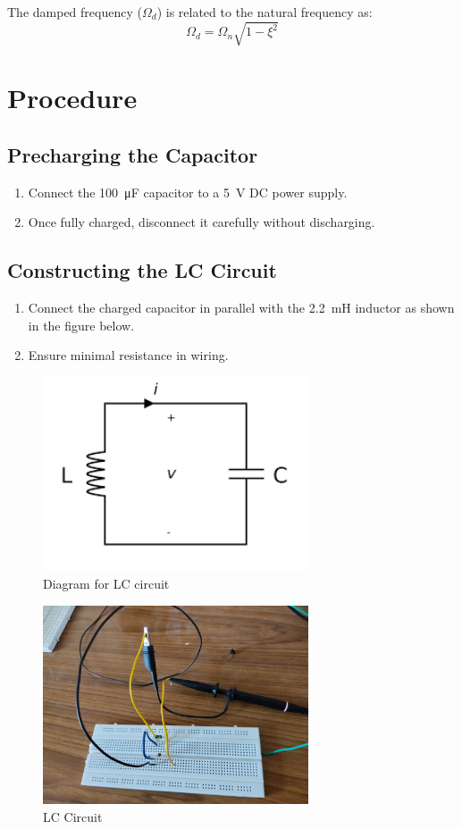 \documentclass[a4paper,12pt]{article}
\begin{document}
The damped frequency (\(\Omega_d\)) is related to the natural frequency as:
\begin{equation*}
    \Omega_d = \Omega_n \sqrt{1 - \xi^2}
\end{equation*}

\section{Procedure}
\subsection{Precharging the Capacitor}
\begin{enumerate}
    \item Connect the \SI{100}{\micro\farad} capacitor to a \SI{5}{V} DC power supply.
    \item Once fully charged, disconnect it carefully without discharging.
\end{enumerate}

\subsection{Constructing the LC Circuit}
\begin{enumerate}
    \item Connect the charged capacitor in parallel with the \SI{2.2}{\milli\henry} inductor as shown in the figure below.
    \item Ensure minimal resistance in wiring.
\end{enumerate}
\begin{figure}[H]
    \centering
    \includegraphics[width=0.7\textwidth]{figs/diagram.png}
    \caption{Diagram for LC circuit}
\end{figure}
\begin{figure}[H]
    \centering
    \includegraphics[width=0.7\textwidth]{figs/circuit.jpeg}
    \caption{LC Circuit}
\end{figure}
\end{document}
